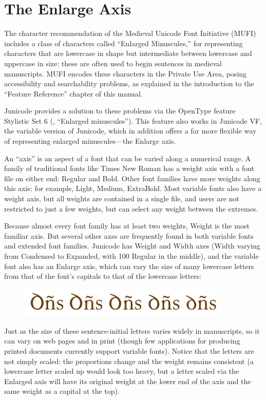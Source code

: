 \chapter{The Enlarge Axis}\hypertarget{enlarge}{}

The character recommendation of the Medieval Unicode Font Initiative (MUFI) includes a class of characters called
“Enlarged Minuscules,” for representing characters that are lowercase in shape but intermediate between lowercase 
and uppercase in size: these are often used to begin sentences in medieval manuscripts. MUFI encodes these characters 
in the Private Use Area, posing accessibility and searchability problems, as explained in the introduction to the 
“Feature Reference” chapter of this manual.

Junicode provides a solution to these problems via the OpenType feature Stylistic Set 6
(, “Enlarged minuscules”). 
This feature also works in Junicode VF, the variable version of Junicode, which in addition offers a far more flexible 
way of representing enlarged minuscules—the Enlarge axis.

An “axis” is an aspect of a font that can be varied along a numerical range. A family of traditional fonts like Times 
New Roman has a weight axis with a font file on either end: Regular and Bold. Other font families have more weights 
along this axis: for example, Light, Medium, ExtraBold. Most variable fonts also have a weight axis, but all weights 
are contained in a single file, and users are not restricted to just a few weights, but can select any weight between 
the extremes.

Because almost every font family has at least two weights, Weight is the most familiar axis. But several other axes are 
frequently found in both variable fonts and extended font families. Junicode has Weight and Width axes (Width varying 
from { Condensed} to { Expanded}, with 100 Regular in the middle), and the variable font also has 
an Enlarge axis, which can vary the size of many lowercase letters from that of the font's capitals to that of the 
lowercase letters:
\begin{figure}[h!]
  \centering\includegraphics[width=4in]{dns.png}
\end{figure}
Just as the size of these sentence-initial letters varies widely in manuscripts, so it can vary on web pages and in 
print (though few applications for producing printed documents currently support variable fonts). Notice that the letters 
are not simply scaled: the proportions change and the weight remains consistent (a lowercase letter scaled up would look 
too heavy, but a letter scaled via the Enlarged axis will have its original weight at the lower end of the axis and the 
same weight as a capital at the top).

